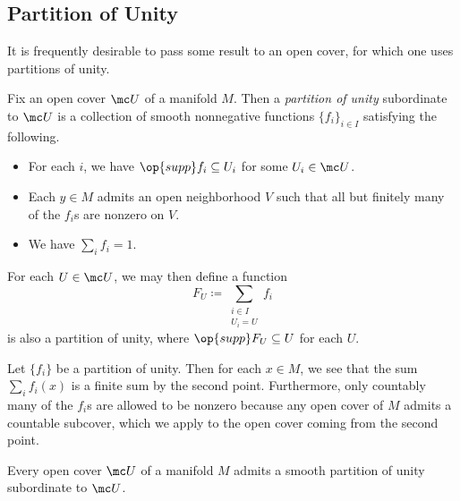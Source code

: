 \documentclass[../notes.tex]{subfiles}
\begin{document}
\subsection{Partition of Unity}
It is frequently desirable to pass some result to an open cover, for which one uses partitions of unity.
\begin{definition}
	Fix an open cover $\mc U$ of a manifold $M$. Then a \textit{partition of unity} subordinate to $\mc U$ is a collection of smooth nonnegative functions $\{f_i\}_{i\in I}$ satisfying the following.
	\begin{itemize}
		\item For each $i$, we have $\op{supp}f_i\subseteq U_i$ for some $U_i\in\mc U$.
		\item Each $y\in M$ admits an open neighborhood $V$ such that all but finitely many of the $f_i$s are nonzero on $V$.
		\item We have $\sum_if_i=1$.
	\end{itemize}
\end{definition}
\begin{remark}
	For each $U\in\mc U$, we may then define a function
	\[F_U\coloneqq\sum_{\substack{i\in I\\U_i=U}}f_i\]
	is also a partition of unity, where $\op{supp}F_U\subseteq U$ for each $U$.
\end{remark}
\begin{remark}
	Let $\{f_i\}$ be a partition of unity. Then for each $x\in M$, we see that the sum $\sum_if_i(x)$ is a finite sum by the second point. Furthermore, only countably many of the $f_i$s are allowed to be nonzero because any open cover of $M$ admits a countable subcover, which we apply to the open cover coming from the second point.
\end{remark}
\begin{proposition}
	Every open cover $\mc U$ of a manifold $M$ admits a smooth partition of unity subordinate to $\mc U$.
\end{proposition}
\end{document}
